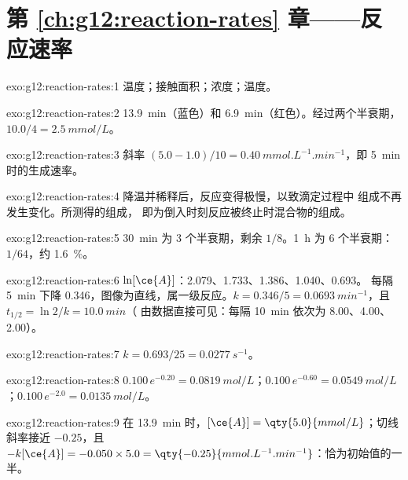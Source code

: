 \section*{第 \ref{ch:g12:reaction-rates} 章——反应速率}

\begin{solution}{exo:g12:reaction-rates:1}
温度；接触面积；浓度；温度。
\end{solution}

\begin{solution}{exo:g12:reaction-rates:2}
\qty{13.9}{min}（蓝色）和 \qty{6.9}{min}（红色）。经过两个半衰期，
$10.0 / 4 = \qty{2.5}{mmol/L}$。
\end{solution}

\begin{solution}{exo:g12:reaction-rates:3}
斜率 $(5.0 - 1.0)/10 = \qty{0.40}{mmol.L^{-1}.min^{-1}}$，即
\qty{5}{min} 时的生成速率。
\end{solution}

\begin{solution}{exo:g12:reaction-rates:4}
降温并稀释后，反应变得极慢，以致滴定过程中
组成不再发生变化。所测得的组成，
即为倒入时刻反应被终止时混合物的组成。
\end{solution}

\begin{solution}{exo:g12:reaction-rates:5}
\qty{30}{min} 为 3 个半衰期，剩余 $1/8$。\qty{1}{h} 为 6 个半衰期：
$1/64$，约 \qty{1.6}{\percent}。
\end{solution}

\begin{solution}{exo:g12:reaction-rates:6}
$\ln[\ce{A}]$：2.079、1.733、1.386、1.040、0.693。
每隔 \qty{5}{min} 下降 0.346，图像为直线，属一级反应。$k = 0.346/5 =
\qty{0.0693}{min^{-1}}$，且 $t_{1/2} = \ln 2 / k = \qty{10.0}{min}$（
由数据直接可见：每隔 \qty{10}{min} 依次为 8.00、4.00、2.00）。
\end{solution}

\begin{solution}{exo:g12:reaction-rates:7}
$k = 0.693 / 25 = \qty{0.0277}{s^{-1}}$。
\end{solution}

\begin{solution}{exo:g12:reaction-rates:8}
$0.100\,e^{-0.20} = \qty{0.0819}{mol/L}$；$0.100\,e^{-0.60} =
\qty{0.0549}{mol/L}$；$0.100\,e^{-2.0} = \qty{0.0135}{mol/L}$。
\end{solution}

\begin{solution}{exo:g12:reaction-rates:9}
在 \qty{13.9}{min} 时，$[\ce{A}] = \qty{5.0}{mmol/L}$；切线斜率接近
$-0.25$，且 $-k[\ce{A}] = -0.050 \times 5.0 =
\qty{-0.25}{mmol.L^{-1}.min^{-1}}$：恰为初始值的一半。
\end{solution}

